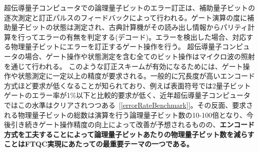 \documentclass[11pt,a4j,dvipdfmx]{jarticle} 					%
\newcommand{\研究課題名}{誤り耐性量子コンピュータに向けた誤り訂正技術の開発(仮)}
\newcommand{\研究機関名}{東京大学}
\newcommand{\研究代表者氏名}{寺師弘二}
\newcommand{\研究期間の最終元号年度}{10}  %
\newcommand{\mybf}[1]{{\bfseries\sffamily#1}}
\begin{document}
%
超伝導量子コンピュータでの論理量子ビットのエラー訂正は、補助量子ビットの逐次測定と訂正パルスのフィードバックによって行われる。ゲート演算の度に補助量子ビットの状態は測定され、古典計算機がその読み出し情報からパリティ計算を行ってエラーの有無を判定する(デコード)。エラーを検出した場合、対応する物理量子ビットにエラーを訂正するゲート操作を行う。
超伝導量子コンピュータの場合、ゲート操作や状態測定を含む全てのビット操作はマイクロ波の照射を通じて行われる。
このような訂正スキームが有効になるためには、ゲート操作や状態測定に一定以上の精度が要求される。一般的に冗長度が高いエンコード方式ほど要求が低くなることが知られており、例えば表面符号では2量子ビットゲートのエラー率が1\%以下と比較的要求が低く、近年超伝導量子コンピュータではこの水準はクリアされつつある~[\ref{errorRateBenchmark}]。その反面、要求される物理量子ビットの総数は演算を行う論理量子ビット数の10-100倍となり、今後引き続きゲート操作精度の向上によって改善が予想されるものの、\mybf{エンコード方式を工夫することによって論理量子ビットあたりの物理量子ビット数を減らすことはFTQC実現にあたっての最重要テーマの一つである。} 
\end{document}

